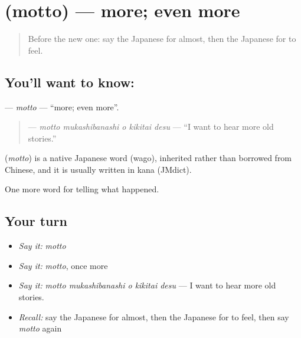 \section[\texorpdfstring{\ja{もっと} (motto)}{もっと (motto)}]{ (motto) — more; even more}

\label{lesson:JA-C316-motto}



\begin{quote}
Before the new one: say the Japanese for almost, then the Japanese for to feel.
\end{quote}

\subsection*{You'll want to know: }
\textbf{} — \emph{motto} — \textquotedblleft{}more; even more\textquotedblright{}.

\begin{quote}
\textbf{  } — \emph{motto mukashibanashi o kikitai desu} — \textquotedblleft{}I want to hear more old stories.\textquotedblright{}
\end{quote}

\begin{cousinweb}
\textbf{} (\emph{motto}) is a native Japanese word (wago), inherited rather than borrowed from Chinese, and it is usually written in kana (JMdict).
\end{cousinweb}

\begin{grammarlens}[title={What you've built}]
One more word for telling what happened.
\end{grammarlens}

\subsection*{Your turn}
\begin{itemize}
\raggedright
  \item \emph{Say it:} \emph{motto}
  \item \emph{Say it:} \emph{motto}, once more
  \item \emph{Say it:} \emph{motto mukashibanashi o kikitai desu} — I want to hear more old stories.
  \item \emph{Recall:} say the Japanese for almost, then the Japanese for to feel, then say \emph{motto} again
\end{itemize}


